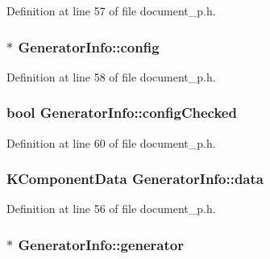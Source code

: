 Definition at line 57 of file document\+\_\+p.\+h.

\hypertarget{structGeneratorInfo_adb5d606668bd3268c19f23e9c3183f98}{
\subsubsection[{config}]{$\ast$ Generator\+Info\+::config}}\label{structGeneratorInfo_adb5d606668bd3268c19f23e9c3183f98}


Definition at line 58 of file document\+\_\+p.\+h.

\hypertarget{structGeneratorInfo_a9143bfaf86f93f46fe719f7ec6c37ab5}{
\subsubsection[{config\+Checked}]{\setlength{\rightskip}{0pt plus 5cm}bool Generator\+Info\+::config\+Checked}}\label{structGeneratorInfo_a9143bfaf86f93f46fe719f7ec6c37ab5}


Definition at line 60 of file document\+\_\+p.\+h.

\hypertarget{structGeneratorInfo_ab0cd82143649f4aad772614dc77e2ef8}{
\subsubsection[{data}]{\setlength{\rightskip}{0pt plus 5cm}K\+Component\+Data Generator\+Info\+::data}}\label{structGeneratorInfo_ab0cd82143649f4aad772614dc77e2ef8}


Definition at line 56 of file document\+\_\+p.\+h.

\hypertarget{structGeneratorInfo_ac8796e620ca4a6f3fb08f610c14a6ec2}{
\subsubsection[{generator}]{$\ast$ Generator\+Info\+::generator}}\label{structGeneratorInfo_ac8796e620ca4a6f3fb08f610c14a6ec2}


